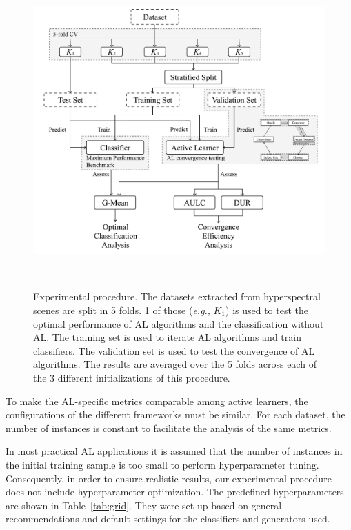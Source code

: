 \documentclass[preprint,12pt]{elsarticle}
\begin{document}
\begin{figure}[H]
	\centering
	\includegraphics[width=\linewidth]{../analysis/experiment_pipeline}
    \caption{
        Experimental procedure. The datasets extracted from hyperspectral
        scenes are split in 5 folds. 1 of those (\textit{e.g.}, $K_1$) is used
        to test the optimal performance of AL algorithms and the
        classification without AL. The training set is used to iterate AL
        algorithms and train classifiers. The validation set is used to test
        the convergence of AL algorithms. The results are averaged over the 5
        folds across each of the 3 different initializations of this
        procedure.
    }~\label{fig:experiment_pipeline}
\end{figure}

To make the AL-specific metrics comparable among active learners, the
configurations of the different frameworks must be similar. For each dataset,
the number of instances is constant to facilitate the analysis of the same
metrics. 

In most practical AL applications it is assumed that the number of instances 
in the initial training sample is too small to perform hyperparameter tuning.
Consequently, in order to ensure realistic results, our experimental procedure
does not include hyperparameter optimization. The predefined hyperparameters
are shown in Table~\ref{tab:grid}. They were set up based on general
recommendations and default settings for the classifiers and generators used.
\end{document}
